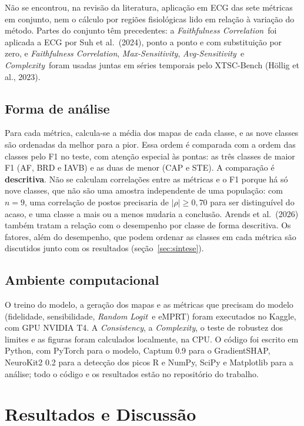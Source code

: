 \documentclass[11pt,a4paper]{article}
\newcommand{\FC}{\textit{Faithfulness Correlation}}
\newcommand{\MS}{\textit{Max-Sensitivity}}
\newcommand{\AS}{\textit{Avg-Sensitivity}}
\newcommand{\CX}{\textit{Complexity}}
\newcommand{\CS}{\textit{Consistency}}
\newcommand{\RL}{\textit{Random Logit}}
\newcommand{\EM}{eMPRT}
\begin{document}
Não se encontrou, na revisão da literatura, aplicação em ECG das sete métricas em conjunto, nem o cálculo por regiões fisiológicas lido em relação à variação do método. Partes do conjunto têm precedentes: a \FC\ foi aplicada a ECG por Suh et al.\ (2024), ponto a ponto e com substituição por zero, e \FC, \MS, \AS\ e \CX\ foram usadas juntas em séries temporais pelo XTSC-Bench (Höllig et al., 2023).

\subsection{Forma de análise}\label{sec:analise}
Para cada métrica, calcula-se a média dos mapas de cada classe, e as nove classes são ordenadas da melhor para a pior. Essa ordem é comparada com a ordem das classes pelo F1 no teste, com atenção especial às pontas: as três classes de maior F1 (AF, BRD e IAVB) e as duas de menor (CAP e STE). A comparação é \textbf{descritiva}. Não se calculam correlações entre as métricas e o F1 porque há só nove classes, que não são uma amostra independente de uma população: com $n = 9$, uma correlação de postos precisaria de $|\rho| \ge 0{,}70$ para ser distinguível do acaso, e uma classe a mais ou a menos mudaria a conclusão. Arends et al.\ (2026) também tratam a relação com o desempenho por classe de forma descritiva. Os fatores, além do desempenho, que podem ordenar as classes em cada métrica são discutidos junto com os resultados (seção~\ref{sec:sintese}).

\subsection{Ambiente computacional}
O treino do modelo, a geração dos mapas e as métricas que precisam do modelo (fidelidade, sensibilidade, \RL\ e \EM) foram executados no Kaggle, com GPU NVIDIA T4. A \CS, a \CX, o teste de robustez dos limites e as figuras foram calculados localmente, na CPU. O código foi escrito em Python, com PyTorch para o modelo, Captum 0.9 para o GradientSHAP, NeuroKit2 0.2 para a detecção dos picos R e NumPy, SciPy e Matplotlib para a análise; todo o código e os resultados estão no repositório do trabalho.

\section{Resultados e Discussão}\label{sec:resultados}
\end{document}
